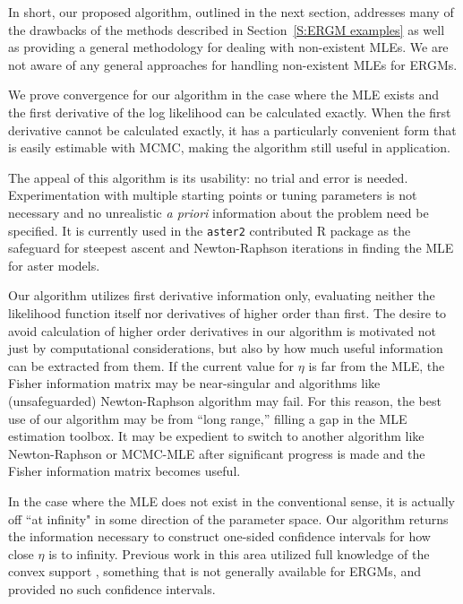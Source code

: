 In short, our proposed algorithm, outlined in the next section,
 addresses many of the drawbacks of the methods
described in Section~\ref{S:ERGM examples} as well as providing a general methodology
for dealing with non-existent MLEs.  We are not aware of any general approaches for
handling non-existent MLEs for ERGMs.  

We prove convergence for our algorithm in the case where the MLE exists and the first 
derivative of the log likelihood can be calculated exactly.
When the first derivative cannot be calculated exactly, 
it has a particularly convenient form that is 
easily estimable with MCMC, making the algorithm still useful in application.

The appeal of this algorithm is its usability: no trial and error is needed.  
Experimentation with multiple starting points or tuning parameters is not necessary 
and no unrealistic \emph{a priori} information about the problem need be specified.  
It is currently used in the \texttt{aster2} contributed R package 
\citep{aster:R} as the safeguard for steepest ascent and Newton-Raphson
 iterations in finding the MLE for aster models.

Our algorithm utilizes first derivative information only, evaluating 
neither the likelihood function itself nor derivatives of higher order than first.
The desire to avoid calculation of higher order derivatives in our algorithm
is motivated not just by 
computational considerations, but 
also by how much useful information can be extracted from them.   
If the current value for $\eta$ is far from the MLE,  
the Fisher information matrix may be near-singular and algorithms like (unsafeguarded) 
Newton-Raphson algorithm may fail.  
For this 
reason, the best use of our algorithm may be from ``long range,'' filling a gap in the MLE estimation toolbox.  It may 
be expedient to switch to another algorithm like Newton-Raphson or MCMC-MLE 
after significant progress is made and the Fisher information matrix becomes useful.  

In the case where the MLE does not exist in the conventional sense, 
it is actually off ``at infinity" in some direction of the parameter space.
Our algorithm returns the information necessary to construct one-sided confidence 
intervals for how close $\eta$ is to infinity.  
Previous work in this area utilized full knowledge
of the convex support \citep{Handcock:degeneracy,Rinaldo:2009,Geyer:gdor}, something
that is not generally available for ERGMs, and provided no such confidence intervals.

